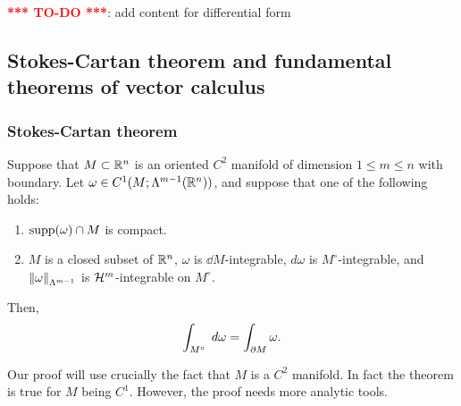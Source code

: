 \documentclass[a4paper]{article}
\newcommand{\TODO}{\textcolor{red}{\textbf{*** TO-DO ***}}}
\begin{document}
\TODO: add content for differential form

\subsection{Stokes-Cartan theorem and fundamental theorems
of vector calculus}

\subsubsection{Stokes-Cartan theorem}

\begin{thm}
Suppose that $M \subset \mathbb{R}^n$ is an oriented $C^2$ manifold
of dimension $1 \leq m \leq n$ with boundary. Let $\omega
\in C^1 (M; \Lambda^{m-1} (\mathbb{R}^n))$, and suppose that one of
the following holds:
\begin{enumerate}
  \item $\operatorname{supp} (\omega) \cap M$ is compact.
  \item $M$ is a closed subset of $\mathbb{R}^n$, $\omega$ is
  $\dd M$-integrable, $d \omega$ is $M^\circ$-integrable,
  and $\left\lVert \omega\right\rVert_{\Lambda^{m-1}}$ is $\mathcal{H}^m$-integrable
  on $M^\circ$.
\end{enumerate}
Then,
\[
\int_{M^\circ} \; d \omega = \int_{\partial M} \omega.
\]
\end{thm}

\begin{remark}
Our proof will use crucially the fact that $M$ is a $C^2$
manifold. In fact the theorem is true for $M$ being
$C^1$. However, the proof needs more analytic tools.
\end{remark}
\end{document}
